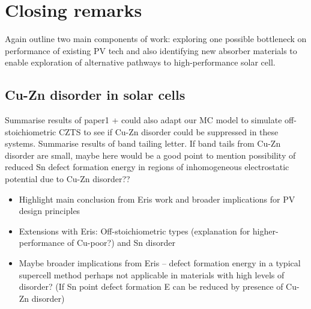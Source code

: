\documentclass[11pt, twoside]{report}
\begin{document}
\chapter{Closing remarks}
Again outline two main components of work: exploring one possible bottleneck on performance of existing PV tech and also identifying new absorber materials to enable exploration of alternative pathways to high-performance solar cell.

\section{Cu-Zn disorder in {\CZTS} solar cells}
Summarise results of paper1 + could also adapt our MC model to simulate off-stoichiometric CZTS to see if Cu-Zn disorder could be suppressed in these systems. Summarise results of band tailing letter. If band tails from Cu-Zn disorder are small, maybe here would be a good point to mention possibility of reduced Sn defect formation energy in regions of inhomogeneous electrostatic potential due to Cu-Zn disorder??
\begin{itemize}
\item Highlight main conclusion from Eris work and broader implications for PV design principles
\item Extensions with Eris: Off-stoichiometric types (explanation for higher-performance of Cu-poor?) and Sn disorder
\item Maybe broader implications from Eris – defect formation energy in a typical supercell method perhaps not applicable in materials with high levels of disorder? (If Sn point defect formation E can be reduced by presence of Cu-Zn disorder)
\end{itemize}
\end{document}
